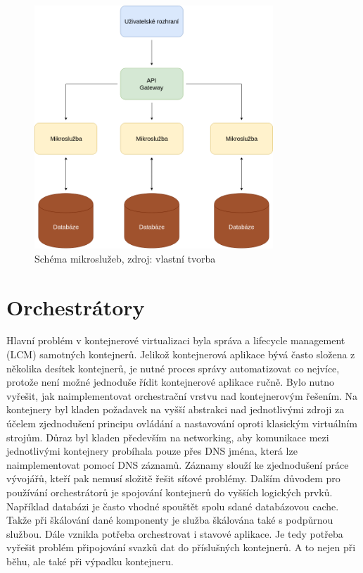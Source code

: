 \begin{figure}[H]
\begin{centering}
\includegraphics[width=0.8\textwidth]{img/mikrosluzby.png}
\par\end{centering}
\caption{Schéma mikroslužeb, zdroj: vlastní tvorba} \label{fig:mikrosluzby}
\end{figure}

\section{Orchestrátory}
Hlavní problém v kontejnerové virtualizaci byla správa a lifecycle management (LCM) samotných kontejnerů. Jelikož kontejnerová aplikace bývá často složena z několika desítek kontejnerů, je nutné proces správy automatizovat co nejvíce, protože není možné jednoduše řídit kontejnerové aplikace ručně. Bylo nutno vyřešit, jak naimplementovat orchestrační vrstvu nad kontejnerovým řešením. Na kontejnery byl kladen požadavek na vyšší abstrakci nad jednotlivými zdroji za účelem zjednodušení principu ovládání a nastavování oproti klasickým virtuálním strojům. Důraz byl kladen především na networking, aby komunikace mezi jednotlivými kontejnery probíhala pouze přes DNS jména, která lze naimplementovat pomocí DNS záznamů. Záznamy slouží ke zjednodušení práce vývojářů, kteří pak nemusí složitě řešit síťové problémy. Dalším důvodem pro používání orchestrátorů je spojování kontejnerů do vyšších logických prvků. Například databázi je často vhodné spouštět spolu sdané databázovou cache. Takže při škálování dané komponenty je služba škálována také s podpůrnou službou. Dále vznikla potřeba orchestrovat i stavové aplikace. Je tedy potřeba vyřešit problém připojování svazků dat do příslušných kontejnerů. A to nejen při běhu, ale také při výpadku kontejneru.

